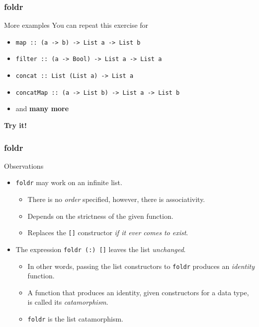 \begin{frame}[fragile]
\frametitle{foldr}

\begin{block}{More examples}
You can repeat this exercise for
\begin{itemize}
\item \lstinline[basicstyle=\ttfamily]$map :: (a -> b) -> List a -> List b$
\item \lstinline[basicstyle=\ttfamily]$filter :: (a -> Bool) -> List a -> List a$
\item \lstinline[basicstyle=\ttfamily]$concat :: List (List a) -> List a$
\item \lstinline[basicstyle=\ttfamily]$concatMap :: (a -> List b) -> List a -> List b$
\item and \textbf{many more}
\end{itemize}
\end{block}

\textbf{Try it!}

\end{frame}


\begin{frame}[fragile]
\frametitle{foldr}

\begin{block}{Observations}
\begin{itemize}
\item \lstinline[basicstyle=\ttfamily]$foldr$ may work on an infinite list.
  \begin{itemize}
  \item There is no \emph{order} specified, however, there is associativity.
  \item Depends on the strictness of the given function.
  \item Replaces the \lstinline[basicstyle=\ttfamily]$[]$ constructor \emph{if it ever comes to exist}.
  \end{itemize}
\item The expression \lstinline[basicstyle=\ttfamily]$foldr (:) []$ leaves the list \emph{unchanged}.
  \begin{itemize}
  \item In other words, passing the list constructors to \lstinline[basicstyle=\ttfamily]$foldr$ produces an \emph{identity} function.
  \item A function that produces an identity, given constructors for a data type, is called its \emph{catamorphism}.
  \item \lstinline[basicstyle=\ttfamily]$foldr$ is the list catamorphism.
  \end{itemize}
\end{itemize}
\end{block}

\end{frame}
